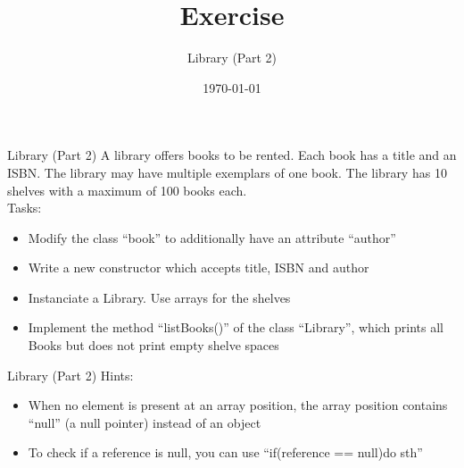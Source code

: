 


\title{Exercise}
\subtitle{Library (Part 2)}
\date{\today}




\begin{frame}
    \titlepage
\end{frame}

\begin{frame}{Library (Part 2)}
    A library offers books to be rented. Each book has a title and an ISBN. The library may have multiple exemplars of one book. The library has 10 shelves with a maximum of 100 books each.\\
    Tasks:
    \begin{itemize}
        \item Modify the class ``book'' to additionally have an attribute ``author'' 
        \item Write a new constructor which accepts title, ISBN and author
        \item Instanciate a Library. Use arrays for the shelves
        \item Implement the method ``listBooks()'' of the class ``Library'', which prints all Books but does not print empty shelve spaces
    \end{itemize}
\end{frame}

\begin{frame}{Library (Part 2)}
    Hints:
    \begin{itemize}
        \item When no element is present at an array position, the array position contains ``null'' (a null pointer) instead of an object
        \item To check if a reference is null, you can use ``if(reference == null){do sth}''
    \end{itemize}
\end{frame}



